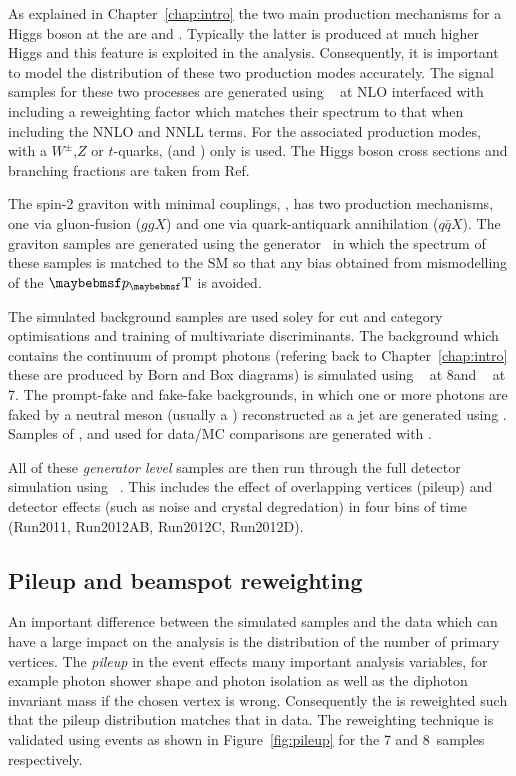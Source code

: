 As explained in Chapter~\ref{chap:intro} the two main production mechanisms for a \SM Higgs boson at the \LHC are \ggH and \VBF. Typically the latter is produced at much higher Higgs \pT and this feature is exploited in the analysis. Consequently, it is important to model the \pT distribution of these two production modes accurately. The signal samples for these two processes are generated using \POWHEG~\cite{powheg1,powheg2} at NLO interfaced with \PYTHIA~\cite{pythia} including a reweighting factor which matches their \pT spectrum to that when including the NNLO and NNLL terms. For the associated production modes, with a $W^{\pm}$,$Z$ or $t$-quarks, (\VH and \ttH) only \PYTHIA is used. The \SM Higgs boson cross sections and branching fractions are taken from Ref.~\cite{LHCHiggsCrossSectionWorkingGroup3}

The spin-2 graviton with minimal couplings, \graviton, has two production mechanisms, one via gluon-fusion ($ggX$) and one via quark-antiquark annihilation ($q\bar{q}X$). The graviton samples are generated using the \JHU generator~\cite{jhu} in which the \pT spectrum of these samples is matched to the SM so that any bias obtained from mismodelling of the $\pT$ is avoided.

The simulated background samples are used soley for cut and category optimisations and training of multivariate discriminants. The background which contains the \QCD continuum of prompt photons (refering back to Chapter~\ref{chap:intro} these are produced by Born and Box diagrams) is simulated using \SHERPA~\cite{sherpa} at 8\TeV and \MADGRAPH~\cite{madgraph} at 7\TeV. The prompt-fake and fake-fake backgrounds, in which one or more photons are faked by a neutral meson (usually a \pizero) reconstructed as a jet are generated using \PYTHIA. Samples of \Zee, \Zmumu and \Zmumugamma used for data/MC comparisons are generated with \POWHEG.

All of these \emph{generator level} samples are then run through the full \CMS detector simulation using \GEANT~\cite{geant}. This includes the effect of overlapping vertices (pileup) and detector effects (such as noise and crystal degredation) in four bins of time (Run2011, Run2012AB, Run2012C, Run2012D).


\subsection{Pileup and beamspot reweighting}
\label{sec:pileup_beamspot}

An important difference between the simulated samples and the data which can have a large impact on the analysis is the distribution of the number of primary vertices. The \emph{pileup} in the event effects many important analysis variables, for example photon shower shape and photon isolation as well as the diphoton invariant mass if the chosen vertex is wrong. Consequently the \MC is reweighted such that the pileup distribution matches that in data. The reweighting technique is validated using \Zmumu events as shown in Figure~\ref{fig:pileup} for the 7 and 8~\TeV samples respectively. 

